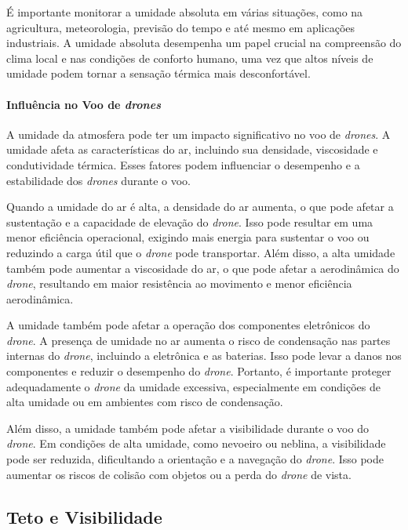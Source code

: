 \documentclass[a4paper, 12pt, onecolumn,singlespacing]{article}
\begin{document}
	É importante monitorar a umidade absoluta em várias situações, como na agricultura, meteorologia, previsão do tempo e até mesmo em aplicações industriais. A umidade absoluta desempenha um papel crucial na compreensão do clima local e nas condições de conforto humano, uma vez que altos níveis de umidade podem tornar a sensação térmica mais desconfortável.
	
	\paragraph{Influência no Voo de \textit{drones}} A umidade da atmosfera pode ter um impacto significativo no voo de \textit{drones}. A umidade afeta as características do ar, incluindo sua densidade, viscosidade e condutividade térmica. Esses fatores podem influenciar o desempenho e a estabilidade dos \textit{drones} durante o voo.
	
	Quando a umidade do ar é alta, a densidade do ar aumenta, o que pode afetar a sustentação e a capacidade de elevação do \textit{drone}. Isso pode resultar em uma menor eficiência operacional, exigindo mais energia para sustentar o voo ou reduzindo a carga útil que o \textit{drone} pode transportar. Além disso, a alta umidade também pode aumentar a viscosidade do ar, o que pode afetar a aerodinâmica do \textit{drone}, resultando em maior resistência ao movimento e menor eficiência aerodinâmica.
	
	A umidade também pode afetar a operação dos componentes eletrônicos do \textit{drone}. A presença de umidade no ar aumenta o risco de condensação nas partes internas do \textit{drone}, incluindo a eletrônica e as baterias. Isso pode levar a danos nos componentes e reduzir o desempenho do \textit{drone}. Portanto, é importante proteger adequadamente o \textit{drone} da umidade excessiva, especialmente em condições de alta umidade ou em ambientes com risco de condensação.
	
	Além disso, a umidade também pode afetar a visibilidade durante o voo do \textit{drone}. Em condições de alta umidade, como nevoeiro ou neblina, a visibilidade pode ser reduzida, dificultando a orientação e a navegação do \textit{drone}. Isso pode aumentar os riscos de colisão com objetos ou a perda do \textit{drone} de vista.
	
	\subsection{Teto e Visibilidade}
	
\end{document}
